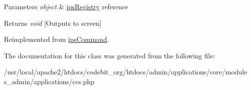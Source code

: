 \begin{DoxyParams}{Parameters}
{\em object} & \hyperlink{classips_registry}{ips\-Registry} reference \\
\hline
\end{DoxyParams}
\begin{DoxyReturn}{Returns}
{\itshape void} \mbox{[}Outputs to screen\mbox{]} 
\end{DoxyReturn}


Reimplemented from \hyperlink{classips_command_afbc4e912a0604b94d47d66744c64d8ba}{ips\-Command}.



The documentation for this class was generated from the following file\-:\begin{DoxyCompactItemize}
\item 
/usr/local/apache2/htdocs/codebit\-\_\-org/htdocs/admin/applications/core/modules\-\_\-admin/applications/ccs.\-php\end{DoxyCompactItemize}
